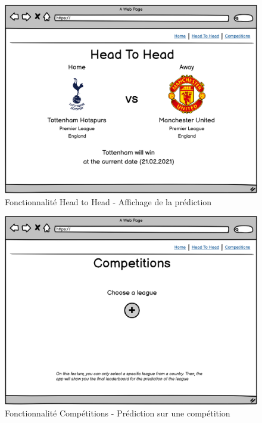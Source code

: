 \documentclass[a4paper,14pt]{extarticle}
\begin{document}
{\begin{figure}[H]
    \centering
    \includegraphics[width=13cm]{../img/maquetteH2H_4.png}
    \caption{Fonctionnalité Head to Head - Affichage de la prédiction}
    \label{fig:maquetteH2H_4}
\end{figure}

\begin{figure}[H]
    \centering
    \includegraphics[width=13cm]{../img/maquetteCompetitions_1.png}
    \caption{Fonctionnalité Compétitions - Prédiction sur une compétition}
    \label{fig:maquetteCompetitions_1}
\end{figure}

}
\end{document}
